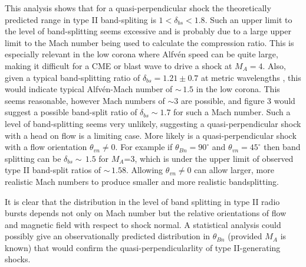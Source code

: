 This analysis shows that for a quasi-perpendicular shock the theoretically predicted range in type II band-spliting is $1<\delta_{bs}<1.8$. Such an upper limit to the level of band-splitting seems excessive and is probably due to a large upper limit to the Mach number being used to calculate the compression ratio. This is especially relevant in the low corona where Alfv\'{e}n speed can be quite large, making it difficult for a CME or blast wave to drive a shock at $M_A=4$. Also, given a typical band-splitting ratio of $\delta_{bs}=1.21\pm0.7$ at metric wavelengths \citep{vrsnak2004}, this would indicate typical Alfv\'{e}n-Mach number of $\sim\,1.5$ in the low corona. This seems reasonable, however Mach numbers of $\sim$3 are possible, and figure 3 would suggest a possible band-split ratio of $\delta_{bs}\sim1.7$ for such a Mach number. Such a level of band-splitting seems very unlikely, suggesting a quasi-perpendicular shock with a head on flow is a limiting case. More likely is a quasi-perpendicular shock with a flow orientation $\theta_{vn}\neq0$. For example if $\theta_{Bn}=90^{\circ}$ and $\theta_{vn}=45^{\circ}$ then band splitting can be $\delta_{bs}\sim\,1.5$ for $M_A$=3, which is under the upper limit of observed type II band-split ratios of $\sim\,1.58$. Allowing $\theta_{vn}\neq0$ can allow larger, more realistic Mach numbers to produce smaller and more realistic bandsplitting.


It is clear that the distribution in the level of band splitting in type II radio bursts depends not only on Mach number but the relative orientations of flow and magnetic field with respect to shock normal. A statistical analysis could possibly give an observationally predicted distribution in $\theta_{Bn}$ (provided $M_A$ is known) that would confirm the quasi-perpendicularlity of type II-generating shocks.


